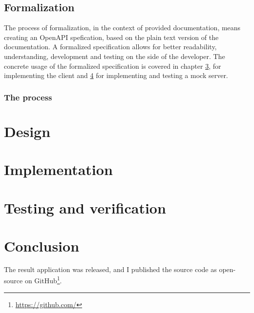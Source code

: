 
\section{Formalization}
The process of formalization, in the context of provided documentation, means creating an OpenAPI spefication, based on the plain text version of the documentation. A formalized specification allows for better readability, understanding, development and testing on the side of the developer. The concrete usage of the formalized specification is covered in chapter \ref{ch6}, for implementing the client and \ref{ch7} for implementing and testing a mock server.

\subsection*{The process}

\chapter{Design}
\label{ch5}

\chapter{Implementation}
\label{ch6}

\chapter{Testing and verification}
\label{ch7}

\chapter{Conclusion}
\label{ch8}

The result application was released, and I published the source code as open-source on GitHub\footnote{\url{https://github.com/}}.

 